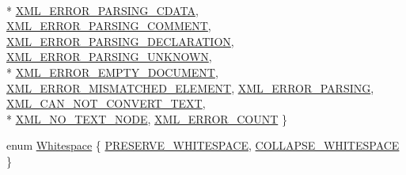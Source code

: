 \begin{DoxyCompactItemize}
\\*
\hyperlink{namespacetinyxml2_a1fbf88509c3ac88c09117b1947414e08a9d181628a1819f2b97835e6bc2c8bb3b}{X\+M\+L\+\_\+\+E\+R\+R\+O\+R\+\_\+\+P\+A\+R\+S\+I\+N\+G\+\_\+\+C\+D\+A\+T\+A}, 
\hyperlink{namespacetinyxml2_a1fbf88509c3ac88c09117b1947414e08a51786809e8b079c770853cf5890a7a35}{X\+M\+L\+\_\+\+E\+R\+R\+O\+R\+\_\+\+P\+A\+R\+S\+I\+N\+G\+\_\+\+C\+O\+M\+M\+E\+N\+T}, 
\hyperlink{namespacetinyxml2_a1fbf88509c3ac88c09117b1947414e08ad45b208578e30dab5a21bff1d8991b87}{X\+M\+L\+\_\+\+E\+R\+R\+O\+R\+\_\+\+P\+A\+R\+S\+I\+N\+G\+\_\+\+D\+E\+C\+L\+A\+R\+A\+T\+I\+O\+N}, 
\hyperlink{namespacetinyxml2_a1fbf88509c3ac88c09117b1947414e08a95a88813812a680fb7372f0149420a97}{X\+M\+L\+\_\+\+E\+R\+R\+O\+R\+\_\+\+P\+A\+R\+S\+I\+N\+G\+\_\+\+U\+N\+K\+N\+O\+W\+N}, 
\\*
\hyperlink{namespacetinyxml2_a1fbf88509c3ac88c09117b1947414e08a1a0478cf44f0a733aa6f21bdf0db80b5}{X\+M\+L\+\_\+\+E\+R\+R\+O\+R\+\_\+\+E\+M\+P\+T\+Y\+\_\+\+D\+O\+C\+U\+M\+E\+N\+T}, 
\hyperlink{namespacetinyxml2_a1fbf88509c3ac88c09117b1947414e08a0cecc816939d9155d33b8a88fd50e4c1}{X\+M\+L\+\_\+\+E\+R\+R\+O\+R\+\_\+\+M\+I\+S\+M\+A\+T\+C\+H\+E\+D\+\_\+\+E\+L\+E\+M\+E\+N\+T}, 
\hyperlink{namespacetinyxml2_a1fbf88509c3ac88c09117b1947414e08af6b4caa10e1f2e9f19a3a24f5f3ce223}{X\+M\+L\+\_\+\+E\+R\+R\+O\+R\+\_\+\+P\+A\+R\+S\+I\+N\+G}, 
\hyperlink{namespacetinyxml2_a1fbf88509c3ac88c09117b1947414e08afdb8840395a7c13dfe6a3e104401c095}{X\+M\+L\+\_\+\+C\+A\+N\+\_\+\+N\+O\+T\+\_\+\+C\+O\+N\+V\+E\+R\+T\+\_\+\+T\+E\+X\+T}, 
\\*
\hyperlink{namespacetinyxml2_a1fbf88509c3ac88c09117b1947414e08a5300bec98feccc8f0cdf567b88821f33}{X\+M\+L\+\_\+\+N\+O\+\_\+\+T\+E\+X\+T\+\_\+\+N\+O\+D\+E}, 
\hyperlink{namespacetinyxml2_a1fbf88509c3ac88c09117b1947414e08a9ebb2775c56387353f5b2de94f6ab71d}{X\+M\+L\+\_\+\+E\+R\+R\+O\+R\+\_\+\+C\+O\+U\+N\+T}
 \}
\item 
enum \hyperlink{namespacetinyxml2_a7f91d00f77360f850fd5da0861e27dd5}{Whitespace} \{ \hyperlink{namespacetinyxml2_a7f91d00f77360f850fd5da0861e27dd5a751769aa625fe5fe5286e9779edec56a}{P\+R\+E\+S\+E\+R\+V\+E\+\_\+\+W\+H\+I\+T\+E\+S\+P\+A\+C\+E}, 
\hyperlink{namespacetinyxml2_a7f91d00f77360f850fd5da0861e27dd5a9a4a309029a6f5e636e20ef5e0b65136}{C\+O\+L\+L\+A\+P\+S\+E\+\_\+\+W\+H\+I\+T\+E\+S\+P\+A\+C\+E}
 \}
\end{DoxyCompactItemize}



